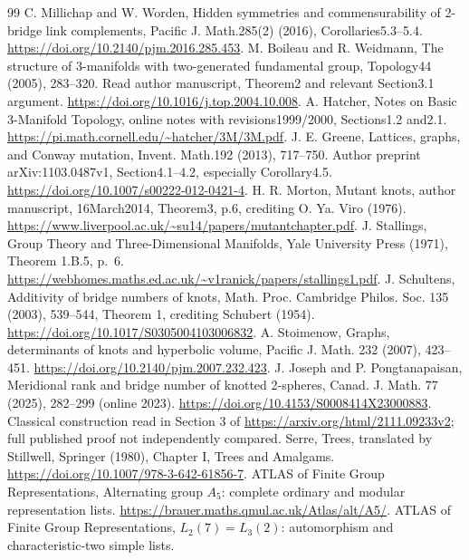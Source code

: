 \documentclass[11pt]{article}
\begin{document}
{\small
\begin{thebibliography}{99}
\setlength{\itemsep}{2pt}
\small
\setlength{\baselineskip}{11pt}
\setlength{\itemsep}{0pt}
 C. Millichap and W. Worden, Hidden symmetries and
commensurability of 2-bridge link complements, Pacific J. Math.285(2)
(2016), Corollaries5.3--5.4.
\url{https://doi.org/10.2140/pjm.2016.285.453}.
 M. Boileau and R. Weidmann, The structure of 3-manifolds
with two-generated fundamental group, Topology44 (2005), 283--320.
Read author manuscript, Theorem2 and relevant Section3.1 argument.
\url{https://doi.org/10.1016/j.top.2004.10.008}.
 A. Hatcher, Notes on Basic 3-Manifold Topology,
online notes with revisions1999/2000, Sections1.2 and2.1.
\url{https://pi.math.cornell.edu/~hatcher/3M/3M.pdf}.
 J. E. Greene, Lattices, graphs, and Conway mutation,
Invent. Math.192 (2013), 717--750. Author preprint arXiv:1103.0487v1,
Section4.1--4.2, especially Corollary4.5.
\url{https://doi.org/10.1007/s00222-012-0421-4}.
 H. R. Morton, Mutant knots, author manuscript,
16March2014, Theorem3, p.6, crediting O. Ya. Viro (1976).
\url{https://www.liverpool.ac.uk/~su14/papers/mutantchapter.pdf}.
 J. Stallings, Group Theory and Three-Dimensional
Manifolds, Yale University Press (1971), Theorem 1.B.5, p.~6.
\url{https://webhomes.maths.ed.ac.uk/~v1ranick/papers/stallings1.pdf}.
 J. Schultens, Additivity of bridge numbers of
knots, Math. Proc. Cambridge Philos. Soc. 135 (2003), 539--544,
Theorem 1, crediting Schubert (1954).
\url{https://doi.org/10.1017/S0305004103006832}.
 A. Stoimenow, Graphs, determinants of knots and
hyperbolic volume, Pacific J. Math. 232 (2007), 423--451.
\url{https://doi.org/10.2140/pjm.2007.232.423}.
 J. Joseph and P. Pongtanapaisan, Meridional rank and
bridge number of knotted 2-spheres, Canad. J. Math. 77 (2025),
282--299 (online 2023).
\url{https://doi.org/10.4153/S0008414X23000883}.
Classical construction read in Section 3 of
\url{https://arxiv.org/html/2111.09233v2}; full published proof
not independently compared.
 Serre, Trees, translated by Stillwell, Springer
(1980), Chapter I, Trees and Amalgams.
\url{https://doi.org/10.1007/978-3-642-61856-7}.
 ATLAS of Finite Group Representations, Alternating
group $A_5$: complete ordinary and modular representation lists.
\url{https://brauer.maths.qmul.ac.uk/Atlas/alt/A5/}.
 ATLAS of Finite Group Representations,
$L_2(7)=L_3(2)$: automorphism and characteristic-two simple lists.

\end{thebibliography}}
\end{document}
